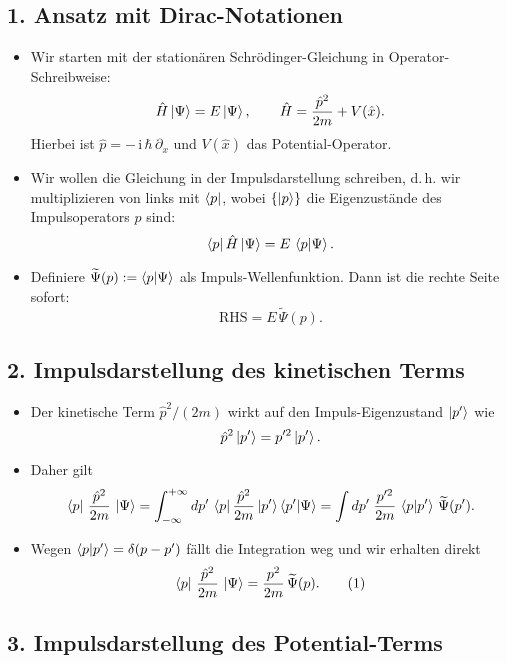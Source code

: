 \documentclass[12pt,a4paper]{scrartcl}
\begin{document}
\subsection*{1. Ansatz mit Dirac-Notationen}

\begin{itemize}
  \item Wir starten mit der stationären Schrödinger-Gleichung in Operator-Schreibweise:
  \[
    \hat H \ket{\Psi} = E \ket{\Psi}, \qquad \hat H = \frac{\hat p^2}{2m} + V(\hat x).
  \]
  Hierbei ist $\hat p = -\,\mathrm{i}\,\hbar\,\partial_x$ und $V(\hat x)$ das Potential-Operator.
  \item Wir wollen die Gleichung in der Impulsdarstellung schreiben, d.\,h. wir multiplizieren von links mit $\bra{p}$, wobei $\{\ket{p}\}$ die Eigenzustände des Impulsoperators $\hat p$ sind:
  \[
    \bra{p}\hat H\ket{\Psi} = E\,\bra{p}\ket{\Psi}.
  \]
  \item Definiere $\widetilde\Psi(p) := \braket{p}{\Psi}$ als Impuls-Wellenfunktion. Dann ist die rechte Seite sofort:
  \[
    \text{RHS} = E\,\widetilde\Psi(p).
  \]
\end{itemize}

\subsection*{2. Impulsdarstellung des kinetischen Terms}

\begin{itemize}
  \item Der kinetische Term $\hat p^2/(2m)$ wirkt auf den Impuls-Eigenzustand $\ket{p'}$ wie
  \[
    \hat p^2 \ket{p'} = p'^2 \ket{p'}.
  \]
  \item Daher gilt
  \[
    \bra{p}\,\frac{\hat p^2}{2m}\,\ket{\Psi}
    = \int_{-\infty}^{+\infty} dp'\,\bra{p}\frac{\hat p^2}{2m}\ket{p'} \braket{p'}{\Psi}
    = \int dp'\;\frac{p'^2}{2m}\,\braket{p}{p'}\,\widetilde\Psi(p').
  \]
  \item Wegen $\braket{p}{p'} = \delta(p - p')$ fällt die Integration weg und wir erhalten direkt
  \[
    \bra{p}\,\frac{\hat p^2}{2m}\,\ket{\Psi} = \frac{p^2}{2m}\,\widetilde\Psi(p).
    \tag{1}
  \]
\end{itemize}

\subsection*{3. Impulsdarstellung des Potential-Terms}
\end{document}

